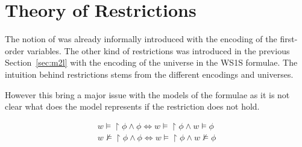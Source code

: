 

\section{Theory of Restrictions}
The notion of was already informally introduced with the encoding
of the first-order variables. The other kind of restrictions was
introduced in the previous Section~\ref{sec:m2l} with the encoding
of the \msl universe in the WS1S formulae. The intuition behind
restrictions stems from the different encodings and universes.

However this bring a major issue with the models of the formulae
as it is not clear what does the model represents if the restriction
does not hold.

\begin{eqnarray}
w \models \restriction{\phi} \wedge \phi \Leftrightarrow 
  w \models \restriction{\phi} \wedge w \models \phi\\
w \not\models \restriction{\phi} \wedge \phi \Leftrightarrow
  w \models \restriction{\phi} \wedge w \not\models \phi
\end{eqnarray}

